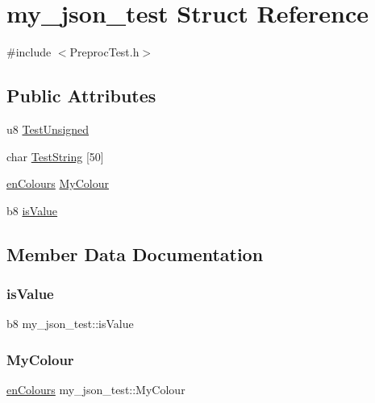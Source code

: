 \hypertarget{structmy__json__test}{}\section{my\+\_\+json\+\_\+test Struct Reference}
\label{structmy__json__test}


{\ttfamily \#include $<$Preproc\+Test.\+h$>$}

\subsection*{Public Attributes}
\begin{DoxyCompactItemize}
\item 
u8 \hyperlink{structmy__json__test_a0ea8af0c0061131955753275ad70dba4}{Test\+Unsigned}
\item 
char \hyperlink{structmy__json__test_a497da009ff7ce7742cf99571b0752227}{Test\+String} \mbox{[}50\mbox{]}
\item 
\hyperlink{PreprocTest_8h_a081cf1a0e70d6e2bd48c98f457742877}{en\+Colours} \hyperlink{structmy__json__test_a6f1212d5aaf1f688e8887d5614d510ca}{My\+Colour}
\item 
b8 \hyperlink{structmy__json__test_a55bffca96cce85232e33fc0c619a9eab}{is\+Value}
\end{DoxyCompactItemize}


\subsection{Member Data Documentation}
\mbox{\label{structmy__json__test_a55bffca96cce85232e33fc0c619a9eab}} 
\subsubsection{\texorpdfstring{is\+Value}{isValue}}
{\footnotesize\ttfamily b8 my\+\_\+json\+\_\+test\+::is\+Value}

\mbox{\label{structmy__json__test_a6f1212d5aaf1f688e8887d5614d510ca}} 
\subsubsection{\texorpdfstring{My\+Colour}{MyColour}}
{\footnotesize\ttfamily \hyperlink{PreprocTest_8h_a081cf1a0e70d6e2bd48c98f457742877}{en\+Colours} my\+\_\+json\+\_\+test\+::\+My\+Colour}


